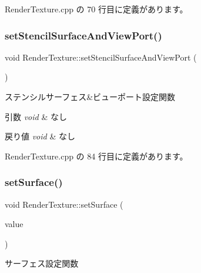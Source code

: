  Render\+Texture.\+cpp の 70 行目に定義があります。

\mbox{\label{class_render_texture_a9cbf3bd5433bf2a3a0b56134ac460b3d}} 
\subsubsection{\texorpdfstring{set\+Stencil\+Surface\+And\+View\+Port()}{setStencilSurfaceAndViewPort()}}
{\footnotesize\ttfamily void Render\+Texture\+::set\+Stencil\+Surface\+And\+View\+Port (\begin{DoxyParamCaption}{ }\end{DoxyParamCaption})}



ステンシルサーフェス\&ビューポート設定関数 


\begin{DoxyParams}{引数}
{\em void} & なし \\
\hline
\end{DoxyParams}

\begin{DoxyRetVals}{戻り値}
{\em void} & なし \\
\hline
\end{DoxyRetVals}


 Render\+Texture.\+cpp の 84 行目に定義があります。

\mbox{\label{class_render_texture_a8c9ea2c6a175191cf9dc356134e71944}} 
\subsubsection{\texorpdfstring{set\+Surface()}{setSurface()}}
{\footnotesize\ttfamily void Render\+Texture\+::set\+Surface (\begin{DoxyParamCaption}\item[{L\+P\+D\+I\+R\+E\+C\+T3\+D\+S\+U\+R\+F\+A\+C\+E9}]{value }\end{DoxyParamCaption})}



サーフェス設定関数 


